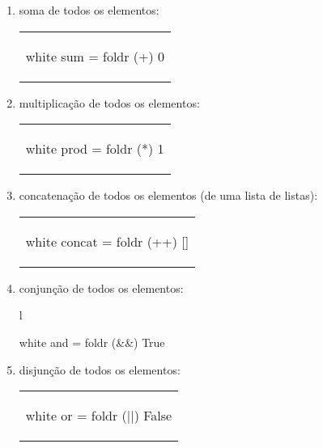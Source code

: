 \begin{enumerate}
\item soma de todos os elementos:

\begin{center}
\begin{tabular}{l}
\begin{alg}{.3\textwidth}{white}
  sum = foldr (+) 0
\end{alg}
\end{tabular}
\end{center}

\item multiplicação de todos os elementos:

\begin{center}
\begin{tabular}{l}
\begin{alg}{.3\textwidth}{white}
  prod = foldr (*) 1
\end{alg}
\end{tabular}
\end{center}

\item concatenação de todos os elementos (de uma lista de listas):

\begin{center}
\begin{tabular}{l}
\begin{alg}{.37\textwidth}{white}
  concat = foldr (++) []
\end{alg}
\end{tabular}
\end{center}

\item conjunção de todos os elementos: 

\begin{center}
\begin{tabular}{l}
\begin{alg}{.35\textwidth}{white}
  and = foldr (&&) True
\end{alg}
\end{tabular}
\end{center}

\item disjunção de todos os elementos: 

\begin{center}
\begin{tabular}{l}
\begin{alg}{.35\textwidth}{white}
  or = foldr (||) False
\end{alg}
\end{tabular}
\end{center}


\end{enumerate}

